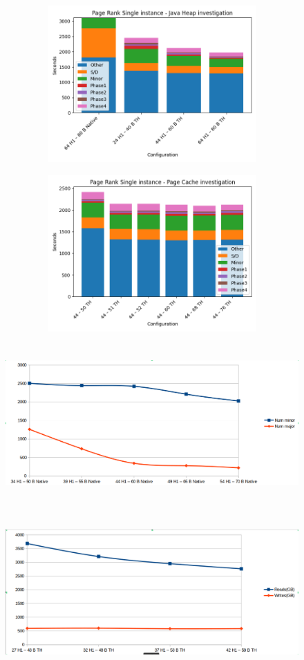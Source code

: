 \documentclass[twocolumn,10pt]{asme2e}
\begin{document}
\begin{figure}[h!]
        \includegraphics[width=12cm,height=6cm]{pr_h1_th.png}
\end{figure}

\begin{figure}[h!]
        \includegraphics[width=12cm,height=6cm]{pr_pc_th.png}
\end{figure}

\begin{figure}[h!]
        \includegraphics[width=12cm,height=6cm]{rw_linr_h1_native.png}
\end{figure}

\begin{figure}[h!]
        \includegraphics[width=12cm,height=6cm]{rw_linr_h1_th.png}
\end{figure}
\end{document}
